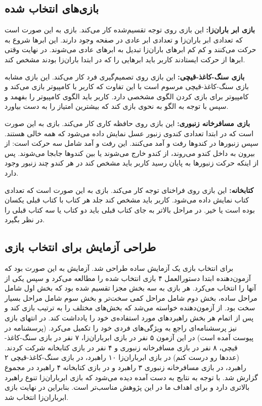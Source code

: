 \documentclass[twoside, a4paper,11pt]{book}
\numberwithin{equation}{chapter}
\numberwithin{table}{chapter}
\numberwithin{figure}{chapter}
\numberwithin{equation}{chapter}
\begin{document}
\subsection{بازی‌های انتخاب شده}
\textbf{بازی ابر باران‌زا:} این بازی روی توجه تقسیم‌شده کار می‌کند. بازی به این صورت است که تعدادی ابر باران‌زا و تعدادی ابر عادی در صفحه وجود دارند. این ابرها شروع به حرکت می‌کنند و کم کم ابرهای باران‌زا تبدیل به ابرهای عادی می‌شوند. در نهایت وقتی ابرها از حرکت ایستادند کاربر باید ابرهایی را که در ابتدا باران‌زا بودند مشخص کند.

\textbf{بازی سنگ-کاغذ-قیچی:} این بازی روی تصمیم‌گیری فرد کار می‌کند. این بازی مشابه بازی سنگ-کاغذ-قیچی مرسوم است با این تفاوت که کاربر با کامپیوتر بازی می‌کند و کامپیوتر برای بازی کردن الگوی مشخصی دارد. کاربر باید الگوی کامپیوتر را بفهمد و سپس با توجه به الگو به نحوی بازی کند که بیشترین امتیاز را به دست بیاورد.

\textbf{بازی مسافرخانه زنبوری:} این بازی روی حافظه کاری کار می‌کند. بازی به این صورت است که در ابتدا تعدادی کندوی زنبور عسل نمایش داده می‌شود که همه خالی هستند. سپس زنبورها در کندوها رفت و آمد می‌کنند. این رفت و آمد شامل سه حرکت است: از بیرون به داخل کندو می‌روند، از کندو خارج می‌شوند یا بین کندوها جابجا می‌شوند. پس از اینکه حرکت زنبورها به پایان رسید کاربر باید مشخص کند در هر کندو چند زنبور وجود دارد.

\textbf{کتابخانه:} این بازی روی فراخنای توجه کار می‌کند. بازی به این صورت است که تعدادی کتاب نمایش داده می‌شود. کاربر باید مشخص کند جلد هر کتاب با کتاب قبلی یکسان بوده است یا خیر. در مراحل بالاتر به جای کتاب قبلی باید دو کتاب یا سه کتاب قبلی را در نظر بگیرد.

\subsection{طراحی آزمایش برای انتخاب بازی}
برای انتخاب بازی یک آزمایش ساده طراحی شد. آزمایش به این صورت بود که آزمون‌دهنده ابتدا دستورالعمل ۴ بازی انتخاب شده را مطالعه می‌کرد و سپس یکی از آنها را انتخاب می‌کرد. هر بازی به سه بخش مجزا تقسیم شده بود که بخش اول شامل مراحل ساده، بخش دوم شامل مراحل کمی سخت‌تر و بخش سوم شامل مراحل بسیار سخت بود. از آزمون‌دهنده خواسته می‌شد که بخش‌های مختلف را به ترتیب بازی کند و پس از اتمام هر بخش راهبرد‌های مورد استفاده‌ی خود را یادداشت کند. در انتهای بازی نیز پرسشنامه‌ای راجع به ویژگی‌های فردی خود را تکمیل می‌کرد. (پرسشنامه در پیوست آمده است)
در این آزمون ۵ نفر در بازی ابرباران‌زا، ۷ نفر در بازی سنگ-کاغذ-قیچی، ۸ نفر در بازی مسافرخانه زنبوری و ۴ نفر در بازی کتابخانه شرکت کردند. (عددها رو درست کنم) در بازی ابرباران‌زا ۱۰ راهبرد، در بازی سنگ-کاغذ-قیچی ۲ راهبرد، در بازی مسافرخانه زنبوری ۳ راهبرد و در بازی کتابخانه ۴ راهبرد در مجموع گزارش شد. با توجه به نتایج به دست آمده دیده می‌شود که بازی ابرباران‌زا تنوع راهبرد بالاتری دارد و برای اهداف ما در این پژوهش مناسب‌تر است. بنابراین در نهایت بازی ابرباران‌زا انتخاب شد.
\end{document}
